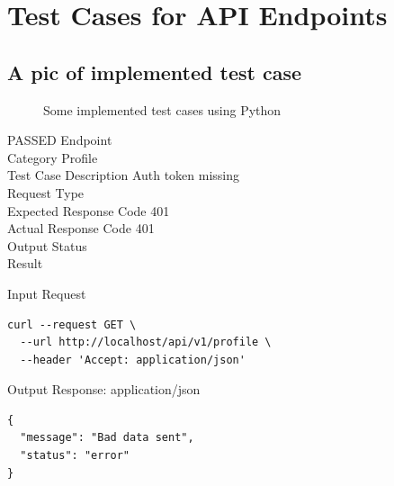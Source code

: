 \section{Test Cases for API Endpoints}
\subsection{A pic of implemented test case}
\begin{figure}[H]
    \centering
    \caption{Some implemented test cases using Python}
    \label{fig:ms5_testCases}
\end{figure}

\begin{testcase}{1}{PASSED}
Endpoint \hfill {}\\
Category \hfill Profile\\
Test Case Description \hfill Auth token missing\\

Request Type    \hfill {}\\
Expected Response Code    \hfill 401\\
Actual Response Code    \hfill 401\\

Output Status \hfill {}\\
Result \hfill {}

\begin{ipblock}{Input Request}
\begin{verbatim}
curl --request GET \
  --url http://localhost/api/v1/profile \
  --header 'Accept: application/json' 
\end{verbatim}
\end{ipblock}

\begin{opblock}{Output Response: application/json}
\begin{verbatim}
{
  "message": "Bad data sent",
  "status": "error"
}
\end{verbatim}
\end{opblock}
\end{testcase}


